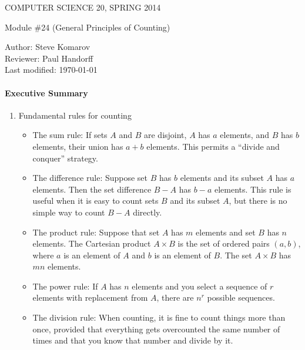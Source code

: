 \documentclass[12pt]{article}
\begin{document}
\begin{center}
COMPUTER SCIENCE 20, SPRING 2014 \\

\smallskip

Module \#24 (General Principles of Counting)
\end{center}
Author: Steve Komarov\\
Reviewer: Paul Handorff\\
Last modified: \today

\medskip

\paragraph*{Executive Summary}
\begin{enumerate}

\item Fundamental rules for counting

\begin{itemize}

\item The sum rule: If sets $A$ and $B$ are disjoint, $A$ has $a$ elements, and $B$ has $b$ elements, their union has $a + b$ elements. This permits a ``divide and conquer'' strategy.

\item The difference rule: Suppose set $B$ has $b$ elements and its subset $A$ has $a$ elements. Then the set difference $B - A$ has $b-a$ elements. This rule is useful when it is easy to count sets $B$ and its subset $A$, but there is no simple way to count $B-A$ directly.

\item The product rule:
Suppose that set $A$ has $m$ elements and set $B$ has $n$ elements.  The Cartesian product $A \times B$ is the set of ordered pairs $(a, b)$, where $a$ is an element of $A$ and $b$ is
an element of $B$.  The set $A \times B$ has $mn$ elements.

\item The power rule: If $A$ has $n$ elements and you select a sequence of $r$ elements with replacement from $A$, there are $n^r$ possible sequences. 


\item The division rule:
When counting, it is fine to count things more than once, provided
that everything gets overcounted the same number of times and that
you know that number and divide by it.

\end{itemize}


\end{enumerate}
\end{document}

